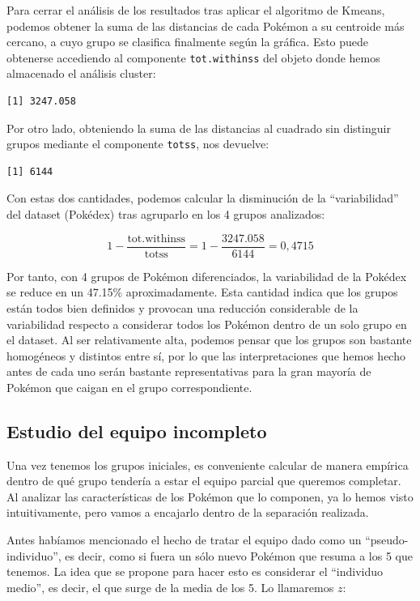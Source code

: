 \documentclass[
  11.8pt,
]{extreport}
\begin{document}
Para cerrar el análisis de los resultados tras aplicar el algoritmo de
Kmeans, podemos obtener la suma de las distancias de cada Pokémon a su
centroide más cercano, a cuyo grupo se clasifica finalmente según la
gráfica. Esto puede obtenerse accediendo al componente
\texttt{tot.withinss} del objeto donde hemos almacenado el análisis
cluster:

\begin{verbatim}
[1] 3247.058
\end{verbatim}

Por otro lado, obteniendo la suma de las distancias al cuadrado sin
distinguir grupos mediante el componente \texttt{totss}, nos devuelve:

\begin{verbatim}
[1] 6144
\end{verbatim}

Con estas dos cantidades, podemos calcular la disminución de la
``variabilidad'' del dataset (Pokédex) tras agruparlo en los 4 grupos
analizados:

\[
1 - \frac{\text{tot.withinss}}{\text{totss}} = 1 - \frac{3247.058}{6144} = 0,4715
\]

Por tanto, con 4 grupos de Pokémon diferenciados, la variabilidad de la
Pokédex se reduce en un 47.15\% aproximadamente. Esta cantidad indica
que los grupos están todos bien definidos y provocan una reducción
considerable de la variabilidad respecto a considerar todos los Pokémon
dentro de un solo grupo en el dataset. Al ser relativamente alta,
podemos pensar que los grupos son bastante homogéneos y distintos entre
sí, por lo que las interpretaciones que hemos hecho antes de cada uno
serán bastante representativas para la gran mayoría de Pokémon que
caigan en el grupo correspondiente.

\subsection{Estudio del equipo
incompleto}\label{estudio-del-equipo-incompleto}

Una vez tenemos los grupos iniciales, es conveniente calcular de manera
empírica dentro de qué grupo tendería a estar el equipo parcial que
queremos completar. Al analizar las características de los Pokémon que
lo componen, ya lo hemos visto intuitivamente, pero vamos a encajarlo
dentro de la separación realizada.

Antes habíamos mencionado el hecho de tratar el equipo dado como un
``pseudo-individuo'', es decir, como si fuera un sólo nuevo Pokémon que
resuma a los 5 que tenemos. La idea que se propone para hacer esto es
considerar el ``individuo medio'', es decir, el que surge de la media de
los 5. Lo llamaremos \(z\):
\end{document}
